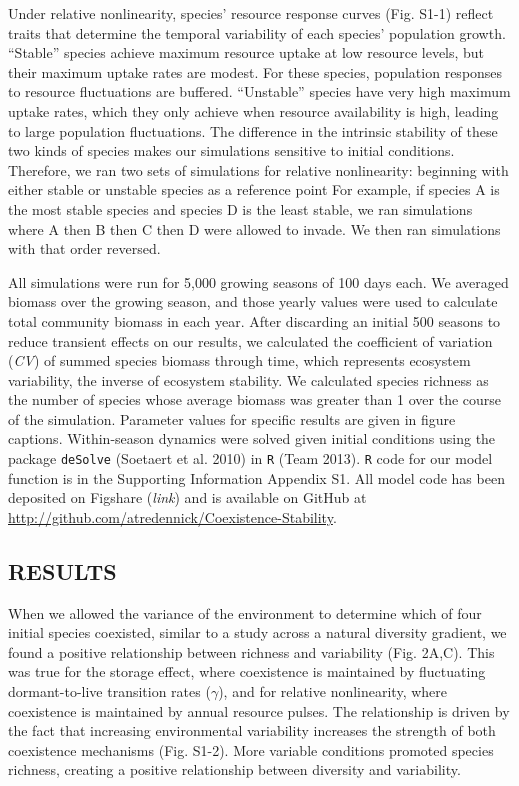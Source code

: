 \documentclass[12pt,]{article}
\begin{document}
Under relative nonlinearity, species' resource response curves (Fig.
S1-1) reflect traits that determine the temporal variability of each
species' population growth. ``Stable'' species achieve maximum resource
uptake at low resource levels, but their maximum uptake rates are
modest. For these species, population responses to resource fluctuations
are buffered. ``Unstable'' species have very high maximum uptake rates,
which they only achieve when resource availability is high, leading to
large population fluctuations. The difference in the intrinsic stability
of these two kinds of species makes our simulations sensitive to initial
conditions. Therefore, we ran two sets of simulations for relative
nonlinearity: beginning with either stable or unstable species as a
reference point For example, if species A is the most stable species and
species D is the least stable, we ran simulations where A then B then C
then D were allowed to invade. We then ran simulations with that order
reversed.

All simulations were run for 5,000 growing seasons of 100 days each. We
averaged biomass over the growing season, and those yearly values were
used to calculate total community biomass in each year. After discarding
an initial 500 seasons to reduce transient effects on our results, we
calculated the coefficient of variation (\emph{CV}) of summed species
biomass through time, which represents ecosystem variability, the
inverse of ecosystem stability. We calculated species richness as the
number of species whose average biomass was greater than 1 over the
course of the simulation. Parameter values for specific results are
given in figure captions. Within-season dynamics were solved given
initial conditions using the package \texttt{deSolve} (Soetaert et al.
2010) in \texttt{R} (Team 2013). \texttt{R} code for our model function
is in the Supporting Information Appendix S1. All model code has been
deposited on Figshare (\emph{link}) and is available on GitHub at
\url{http://github.com/atredennick/Coexistence-Stability}.

\subsection{RESULTS}\label{results}

When we allowed the variance of the environment to determine which of
four initial species coexisted, similar to a study across a natural
diversity gradient, we found a positive relationship between richness
and variability (Fig. 2A,C). This was true for the storage effect, where
coexistence is maintained by fluctuating dormant-to-live transition
rates (\(\gamma\)), and for relative nonlinearity, where coexistence is
maintained by annual resource pulses. The relationship is driven by the
fact that increasing environmental variability increases the strength of
both coexistence mechanisms (Fig. S1-2). More variable conditions
promoted species richness, creating a positive relationship between
diversity and variability.
\end{document}
